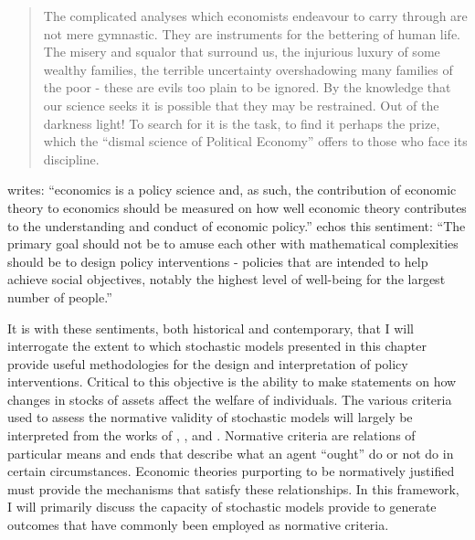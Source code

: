 \documentclass[../main.tex]{subfiles}
\begin{document}
\blockquote{
The complicated analyses which economists endeavour to carry through are not mere gymnastic.
They are instruments for the bettering of human life.
The misery and squalor that surround us, the injurious luxury of some wealthy families, the terrible uncertainty overshadowing many families of the poor - these are evils too plain to be ignored.
By the knowledge that our science seeks it is possible that they may be restrained.
Out of the darkness light!
To search for it is the task, to find it perhaps the prize, which the \enquote{dismal science of Political Economy} offers to those who face its discipline.
}

\noindent \textcite[238]{Varian1996} writes: \enquote{economics is a policy science and, as such, the contribution of economic theory to economics should be measured on how well economic theory contributes to the understanding and conduct of economic policy.}
\textcite[30]{Leamer2012} echos this sentiment:
\enquote{The primary goal  should not be to amuse each other with mathematical complexities \textelp{}  should be to design policy interventions - policies that are intended to help achieve social objectives, notably the highest level of well-being for the largest number of people.}{\footnotemark}

\addtocounter{footnote}{-1}

It is with these sentiments, both historical and contemporary, that I will interrogate the extent to which stochastic models presented in this chapter provide useful methodologies for the design and interpretation of policy interventions.
Critical to this objective is the ability to make statements on how changes in stocks of assets affect the welfare of individuals.
The various criteria used to assess the normative validity of stochastic models will largely be interpreted from the works of \textcite{Grune-Yanoff2014}, \textcite{Berg2014}, and \textcite{Hands2014}.
Normative criteria are relations of particular means and ends that describe what an agent \enquote{ought} do or not do in certain circumstances.
Economic theories purporting to be normatively justified must provide the mechanisms that satisfy these relationships.
In this framework, I will primarily discuss the capacity of stochastic models provide to generate outcomes that have commonly been employed as normative criteria.
\end{document}
